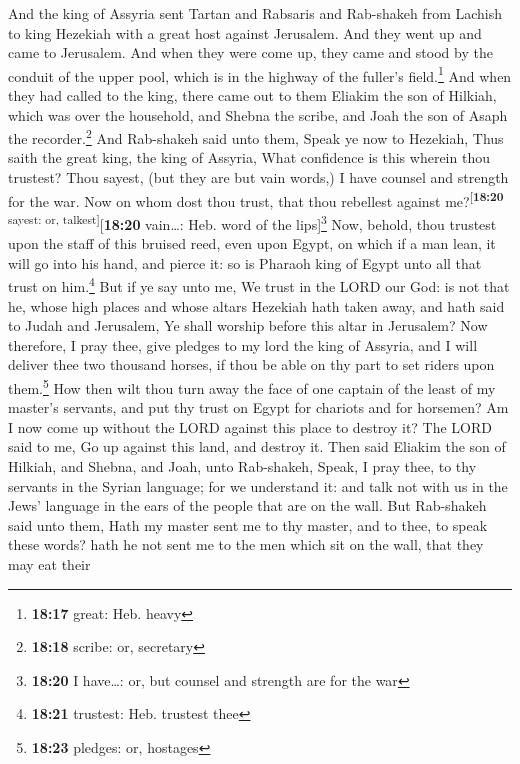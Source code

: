  And the king of Assyria sent Tartan and Rabsaris and
Rab-shakeh from Lachish to king Hezekiah with a great host against
Jerusalem. And they went up and came to Jerusalem. And when they were
come up, they came and stood by the conduit of the upper pool, which is
in the highway of the fuller's field.\footnote{\textbf{18:17} great:
  Heb. heavy}  And when they had called to the king,
there came out to them Eliakim the son of Hilkiah, which was over the
household, and Shebna the scribe, and Joah the son of Asaph the
recorder.\footnote{\textbf{18:18} scribe: or, secretary} 
And Rab-shakeh said unto them, Speak ye now to Hezekiah, Thus saith the
great king, the king of Assyria, What confidence is this wherein thou
trustest?  Thou sayest, (but they are but vain words,) I
have counsel and strength for the war. Now on whom dost thou trust, that
thou rebellest against me?\textsuperscript{{[}\textbf{18:20} sayest: or,
talkest{]}}{[}\textbf{18:20} vain\ldots: Heb. word of the
lips{]}\footnote{\textbf{18:20} I have\ldots: or, but counsel and
  strength are for the war}  Now, behold, thou trustest
upon the staff of this bruised reed, even upon Egypt, on which if a man
lean, it will go into his hand, and pierce it: so is Pharaoh king of
Egypt unto all that trust on him.\footnote{\textbf{18:21} trustest: Heb.
  trustest thee}  But if ye say unto me, We trust in the
LORD our God: is not that he, whose high places and whose altars
Hezekiah hath taken away, and hath said to Judah and Jerusalem, Ye shall
worship before this altar in Jerusalem?  Now therefore, I
pray thee, give pledges to my lord the king of Assyria, and I will
deliver thee two thousand horses, if thou be able on thy part to set
riders upon them.\footnote{\textbf{18:23} pledges: or, hostages}
 How then wilt thou turn away the face of one captain of
the least of my master's servants, and put thy trust on Egypt for
chariots and for horsemen?  Am I now come up without the
LORD against this place to destroy it? The LORD said to me, Go up
against this land, and destroy it.  Then said Eliakim the
son of Hilkiah, and Shebna, and Joah, unto Rab-shakeh, Speak, I pray
thee, to thy servants in the Syrian language; for we understand it: and
talk not with us in the Jews' language in the ears of the people that
are on the wall.  But Rab-shakeh said unto them, Hath my
master sent me to thy master, and to thee, to speak these words? hath he
not sent me to the men which sit on the wall, that they may eat their
